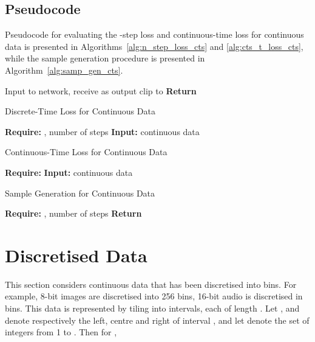 \documentclass[11pt,table]{article}
\newcommand{\0}[1]{\constvec{0}{#1}}
\newcommand{\1}[1]{\constvec{1}{#1}}
\begin{document}
\subsection{Pseudocode}
Pseudocode for evaluating the -step loss  and continuous-time loss  for continuous data is presented in Algorithms~\ref{alg:n_step_loss_cts} and \ref{alg:cts_t_loss_cts}, while the sample generation procedure is presented in Algorithm~\ref{alg:samp_gen_cts}.
\begin{algorithm}[H]
\begin{algorithmic}
\If{}
\State 
\Else
\State Input  to network, receive  as output
\State 
\State clip  to 
\EndIf
\State \textbf{Return} 
\EndFunction
\end{algorithmic}
\end{algorithm}
\begin{algorithm}[H]
\caption{Discrete-Time Loss  for Continuous Data}\label{alg:n_step_loss_cts}
\begin{algorithmic}
\State \textbf{Require:} , number of steps 
\State \textbf{Input:} continuous data 
\State 
\State 
\State 
\State 
\State 
\State 
\end{algorithmic}
\end{algorithm}
\begin{algorithm}[H]
\caption{Continuous-Time Loss  for Continuous Data}\label{alg:cts_t_loss_cts}
\begin{algorithmic}
\State \textbf{Require:} 
\State \textbf{Input:} continuous data 
\State 
\State 
\State 
\State 
\State 
\end{algorithmic}
\end{algorithm}
\begin{algorithm}[H]
\caption{Sample Generation for Continuous Data}\label{alg:samp_gen_cts}
\begin{algorithmic}
\State \textbf{Require:} , number of steps 
\State 
\State 
{} 
    \State 
    \State 
    \State 
    \State 
    \State 
    \State 
\EndFor
\State 
\State \textbf{Return} 
\end{algorithmic}
\end{algorithm}
\section{Discretised Data}\label{sec:discretised}
This section considers continuous data that has been discretised into  bins.
For example, 8-bit images are discretised into 256 bins, 16-bit audio is discretised in  bins.
This data is represented by tiling  into  intervals, each of length .
Let ,  and  denote respectively the left, centre and right of interval , and let  denote the set of integers from 1 to .
Then for ,
 
\end{document}
